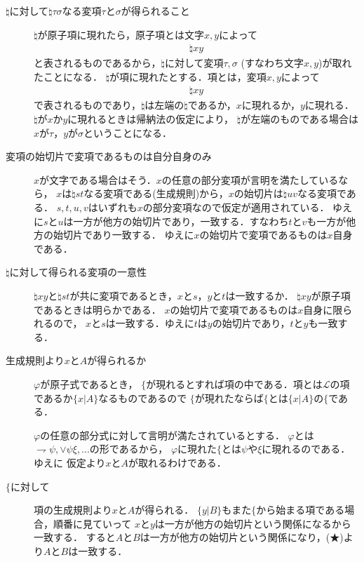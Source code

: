 \documentclass[a4j,10.5pt,oneside,openany]{jsbook}
\begin{document}
	\begin{description}
		\item[$\natural$に対して$\natural \tau \sigma$なる変項$\tau$と$\sigma$が得られること]
			$\natural$が原子項に現れたら，原子項とは文字$x,y$によって
			\begin{align}
				\natural xy
			\end{align}
			と表されるものであるから，$\natural$に対して変項$\tau,\sigma$ (すなわち文字$x,y$)が取れたことになる．
			$\natural$が項に現れたとする．項とは，変項$x,y$によって
			\begin{align}
				\natural xy
			\end{align}
			で表されるものであり，$\natural$は左端の$\natural$であるか，$x$に現れるか，$y$に現れる．
			$\natural$が$x$か$y$に現れるときは帰納法の仮定により，
			$\natural$が左端のものである場合は$x$が$\tau$，$y$が$\sigma$ということになる．
			
		\item[変項の始切片で変項であるものは自分自身のみ]
			$x$が文字である場合はそう．$x$の任意の部分変項が言明を満たしているなら，
			$x$は$\natural st$なる変項である(生成規則)から，$x$の始切片は$\natural uv$なる変項である．
			$s,t,u,v$はいずれも$x$の部分変項なので仮定が適用されている．
			ゆえに$s$と$u$は一方が他方の始切片であり，一致する．すなわち$t$と$v$も一方が他方の始切片であり一致する．
			ゆえに$x$の始切片で変項であるものは$x$自身である．
			
		\item[$\natural$に対して得られる変項の一意性]
			$\natural xy$と$\natural st$が共に変項であるとき，$x$と$s$，$y$と$t$は一致するか．
			$\natural xy$が原子項であるときは明らかである．
			$x$の始切片で変項であるものは$x$自身に限られるので，
			$x$と$s$は一致する．ゆえに$t$は$y$の始切片であり，$t$と$y$も一致する．
		
		\item[生成規則より$x$と$A$が得られるか]
			$\varphi$が原子式であるとき，
			$\{$が現れるとすれば項の中である．項とは$\mathcal{L}$の項であるか$\{x|A\}$なるものであるので
			$\{$が現れたならば$\{$とは$\{x|A\}$の$\{$である．
			
			$\varphi$の任意の部分式に対して言明が満たされているとする．
			$\varphi$とは$\rightharpoondown \psi,\vee \psi \xi,...$の形であるから，
			$\varphi$に現れた$\{$とは$\psi$や$\xi$に現れるのである．ゆえに
			仮定より$x$と$A$が取れるわけである．
			
		\item[$\{$に対して]
			項の生成規則より$x$と$A$が得られる．
			$\{y|B\}$もまた$\{$から始まる項である場合，順番に見ていって
			$x$と$y$は一方が他方の始切片という関係になるから一致する．
			すると$A$と$B$は一方が他方の始切片という関係になり，(★)より$A$と$B$は一致する．
			

\end{description}
\end{document}
